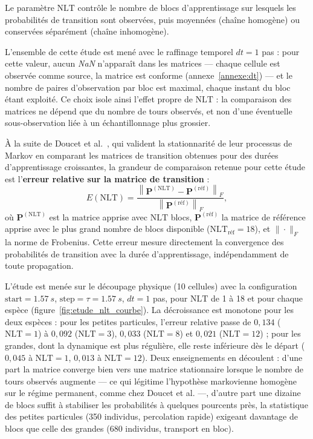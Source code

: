 \documentclass[french]{MemoireMaster}
\begin{document}
Le paramètre $\mathrm{NLT}$ contrôle le nombre de blocs d'apprentissage sur lesquels les probabilités de transition sont observées, puis moyennées (chaîne homogène) ou conservées séparément (chaîne inhomogène).

L'ensemble de cette étude est mené avec le raffinage temporel $dt = 1$ pas : pour cette valeur, aucun \textit{NaN} n'apparaît dans les matrices --- chaque cellule est observée comme source, la matrice est conforme (annexe~\ref{annexe:dt}) --- et le nombre de paires d'observation par bloc est maximal, chaque instant du bloc étant exploité. Ce choix isole ainsi l'effet propre de $\mathrm{NLT}$ : la comparaison des matrices ne dépend que du nombre de tours observés, et non d'une éventuelle sous-observation liée à un échantillonnage plus grossier.

À la suite de Doucet et al.~\cite{doucet2008}, qui valident la stationnarité de leur processus de Markov en comparant les matrices de transition obtenues pour des durées d'apprentissage croissantes, la grandeur de comparaison retenue pour cette étude est l'\textbf{erreur relative sur la matrice de transition} :
\begin{equation}
  E(\mathrm{NLT})
  =
  \frac{\left\| \mathbf{P}^{(\mathrm{NLT})} - \mathbf{P}^{(\mathrm{réf})} \right\|_F}
       {\left\| \mathbf{P}^{(\mathrm{réf})} \right\|_F},
  \label{eq:erreur_relative_nlt}
\end{equation}
où $\mathbf{P}^{(\mathrm{NLT})}$ est la matrice apprise avec $\mathrm{NLT}$ blocs, $\mathbf{P}^{(\mathrm{réf})}$ la matrice de référence apprise avec le plus grand nombre de blocs disponible ($\mathrm{NLT}_{\mathrm{réf}} = 18$), et $\|\cdot\|_F$ la norme de Frobenius. Cette erreur mesure directement la convergence des probabilités de transition avec la durée d'apprentissage, indépendamment de toute propagation.

L'étude est menée sur le découpage physique (10 cellules) avec la configuration $\mathrm{start} = \SI{1.57}{s}$, $\mathrm{step} = \tau = \SI{1.57}{s}$, $dt = 1$ pas, pour $\mathrm{NLT}$ de 1 à 18 et pour chaque espèce (figure~\ref{fig:etude_nlt_courbe}). La décroissance est monotone pour les deux espèces : pour les petites particules, l'erreur relative passe de $0{,}134$ ($\mathrm{NLT} = 1$) à $0{,}092$ ($\mathrm{NLT} = 3$), $0{,}033$ ($\mathrm{NLT} = 8$) et $0{,}021$ ($\mathrm{NLT} = 12$) ; pour les grandes, dont la dynamique est plus régulière, elle reste inférieure dès le départ ($0{,}045$ à $\mathrm{NLT} = 1$, $0{,}013$ à $\mathrm{NLT} = 12$). Deux enseignements en découlent : d'une part la matrice converge bien vers une matrice stationnaire lorsque le nombre de tours observés augmente --- ce qui légitime l'hypothèse markovienne homogène sur le régime permanent, comme chez Doucet et al. ---, d'autre part une dizaine de blocs suffit à stabiliser les probabilités à quelques pourcents près, la statistique des petites particules (350 individus, percolation rapide) exigeant davantage de blocs que celle des grandes (680 individus, transport en bloc).
\end{document}
